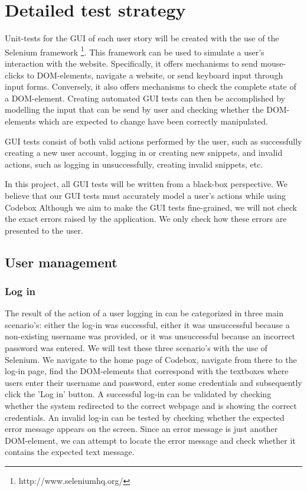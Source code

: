 \documentclass[10pt,a4paper,BCOR12mm, headexclude, footexclude,
  twoside, openright]{scrartcl}
\numberwithin{equation}{section} %
\numberwithin{figure}{section} %
\numberwithin{table}{section} %
\begin{document}
\pagestyle{plain}

\section{Detailed test strategy}

Unit-tests for the GUI of each user story will be created with the use of the Selenium framework \footnote{http://www.seleniumhq.org/}.
This framework can be used to simulate a user's interaction with the website. Specifically, it offers mechanisms to send mouse-clicks to DOM-elements, navigate a website, or send keyboard input through input forms.
Conversely, it also offers mechanisms to check the complete state of a DOM-element.
Creating automated GUI tests can then be accomplished by modelling the input that can be send by user and checking whether the DOM-elements which are expected to change have been correctly manipulated.

GUI tests consist of both valid actions performed by the user, such as successfully creating a new user account, logging in or creating new snippets, and invalid actions, such as logging in unsuccessfully, creating invalid snippets, etc.

In this project, all GUI tests will be written from a black-box perspective.
We believe that our GUI tests must accurately model a user's actions while using Codebox
 Although we aim to make the GUI tests fine-grained, we will not check the exact errors raised by the application. We only check how these errors are presented to the user.

\subsection{User management}

\subsubsection*{Log in}
The result of the action of a user logging in can be categorized in three main scenario's: either the log-in was successful, either it was unsuccessful because a non-existing username was provided, or it was unsuccessful because an incorrect password was entered.
We will test these three scenario's with the use of Selenium.
We navigate to the home page of Codebox, navigate from there to the log-in page, find the DOM-elements that correspond with the textboxes where users enter their username and password, enter some credentials and subsequently click the 'Log in' button.
A successful log-in can be validated by checking whether the system redirected to the correct webpage and is showing the correct credentials.
An invalid log-in can be tested by checking whether the expected error message appears on the screen.
Since an error message is just another DOM-element, we can attempt to locate the error message and check whether it contains the expected text message.
\end{document}
